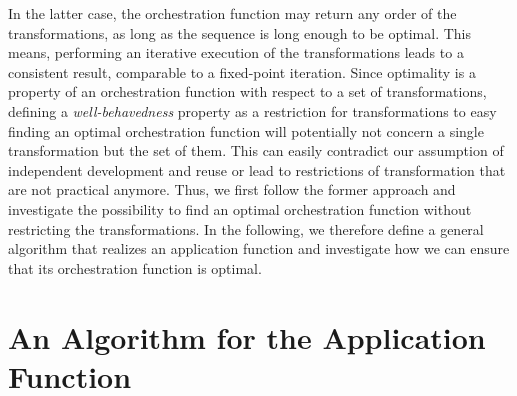 
In the latter case, the orchestration function may return any order of the transformations, as long as the sequence is long enough to be optimal.
This means, performing an iterative execution of the transformations leads to a consistent result, comparable to a fixed-point iteration.
Since optimality is a property of an orchestration function with respect to a set of transformations, defining a \emph{well-behavedness} property as a restriction for transformations to easy finding an optimal orchestration function will potentially not concern a single transformation but the set of them.
This can easily contradict our assumption of independent development and reuse or lead to restrictions of transformation that are not practical anymore.
Thus, we first follow the former approach and investigate the possibility to find an optimal orchestration function without restricting the transformations.
In the following, we therefore define a general algorithm that realizes an application function and investigate how we can ensure that its orchestration function is optimal.






\section{An Algorithm for the Application Function}


